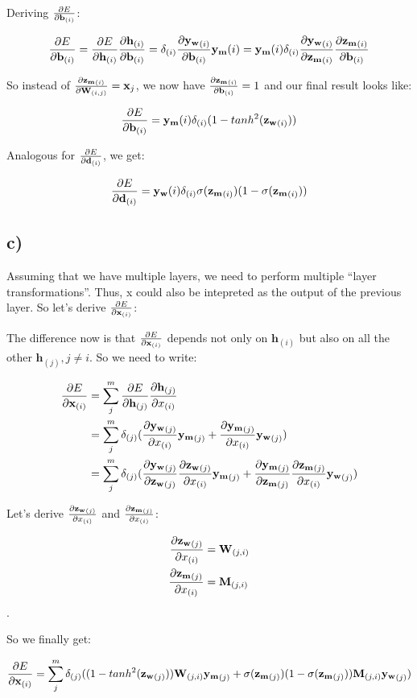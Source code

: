 Deriving $\frac{\partial E}{\partial \mathbf{b}_{(i)}}$:

\[
\frac{\partial E}{\partial \mathbf{b}_{(i)}} = \frac{\partial E}{\partial \mathbf{h}_{(i)}}\frac{\partial \mathbf{h}_{(i)}}{\partial \mathbf{b}_{(i)}} = \mathbf{\delta}_{(i)}\frac{\partial \mathbf{y_w}_{(i)}}{\partial \mathbf{b}_{(i)}}\mathbf{y_m}{(i)} = \mathbf{y_m}{(i)}\mathbf{\delta}_{(i)}\frac{\partial \mathbf{y_w}_{(i)}}{\partial \mathbf{z_m}_{(i)}}\frac{\partial \mathbf{z_m}_{(i)}}{\partial \mathbf{b}_{(i)}}
\]

So instead of $\frac{\partial \mathbf{z_m}_{(i)}}{\partial \mathbf{W}_{(i,j)}} = \mathbf{x}_j$, we now have $\frac{\partial \mathbf{z_m}_{(i)}}{\partial \mathbf{b}_{(i)}} = 1$ 
and our final result looks like:

\[
\frac{\partial E}{\partial \mathbf{b}_{(i)}} = \mathbf{y_m}{(i)}\mathbf{\delta}_{(i)}(1 - tanh^2(\mathbf{z_w}_{(i)}))
\]

Analogous for $\frac{\partial E}{\partial \mathbf{d}_{(i)}}$, we get:

\[
\frac{\partial E}{\partial \mathbf{d}_{(i)}} = \mathbf{y_w}{(i)}\mathbf{\delta}_{(i)}\sigma(\mathbf{z_m}_{(i)}) (1 - \sigma(\mathbf{z_m}_{(i)}))
\]


\subsection*{c)} %
\label{sub:c_}

Assuming that we have multiple layers, we need to perform multiple ``layer transformations''. Thus, x could also be intepreted 
as the output of the previous layer. So let's derive $\frac{\partial E}{\partial \mathbf{x}_{(i)}}$:

The difference now is that $\frac{\partial E}{\partial \mathbf{x}_{(i)}}$ depends not only on $\mathbf{h}_{(i)}$ but also on 
all the other $\mathbf{h}_{(j)}, j \ne i$. So we need to write:

\begin{align*}
    \frac{\partial E}{\partial \mathbf{x}_{(i)}} &= \sum_j^m \frac{\partial E}{\partial \mathbf{h}_{(j)}}\frac{\partial \mathbf{h}_{(j)}}{\partial x_{(i)}} \\
    &= \sum_j^m \mathbf{\delta}_{(j)} (\frac{\partial \mathbf{y_w}_{(j)}}{\partial x_{(i)}}\mathbf{y_m}_{(j)} + \frac{\partial \mathbf{y_m}_{(j)}}{\partial x_{(i)}}\mathbf{y_w}_{(j)})\\
    &= \sum_j^m \mathbf{\delta}_{(j)} (\frac{\partial \mathbf{y_w}_{(j)}}{\partial \mathbf{z_w}_{(j)}}\frac{\partial \mathbf{z_w}_{(j)}}{\partial x_{(i)}}\mathbf{y_m}_{(j)} + \frac{\partial \mathbf{y_m}_{(j)}}{\partial \mathbf{z_m}_{(j)}}\frac{\partial \mathbf{z_m}_{(j)}}{\partial x_{(i)}}\mathbf{y_w}_{(j)}) \\
\end{align*}

Let's derive $\frac{\partial \mathbf{z_w}_{(j)}}{\partial x_{(i)}}$ and $\frac{\partial \mathbf{z_m}_{(j)}}{\partial x_{(i)}}$:
 
\begin{align*}
    \frac{\partial \mathbf{z_w}_{(j)}}{\partial x_{(i)}} &= \mathbf{W}_{(j,i)} \\
    \frac{\partial \mathbf{z_m}_{(j)}}{\partial x_{(i)}} &= \mathbf{M}_{(j,i)} \\
\end{align*}.

So we finally get: 

\[
\frac{\partial E}{\partial \mathbf{x}_{(i)}} = \sum_j^m \mathbf{\delta}_{(j)} ((1 - tanh^2(\mathbf{z_w}_{(j)}))\mathbf{W}_{(j,i)}\mathbf{y_m}_{(j)} + \sigma(\mathbf{z_m}_{(j)}) (1 - \sigma(\mathbf{z_m}_{(j)}))\mathbf{M}_{(j,i)}\mathbf{y_w}_{(j)})
\]









